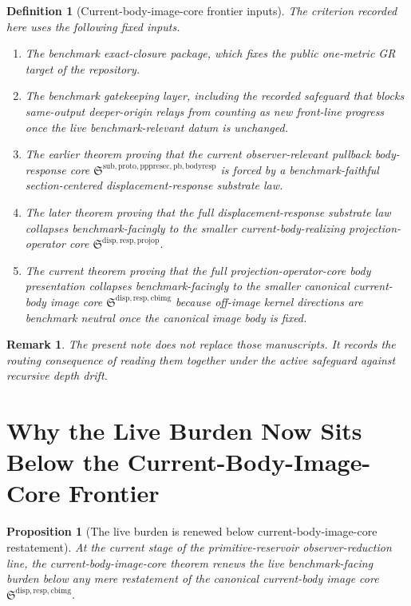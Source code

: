 \documentclass[11pt]{article}
\newcommand{\ProjectionOperatorCore}{\mathfrak S^{\mathrm{disp,resp,projop}}}
\newcommand{\CurrentBodyImageCore}{\mathfrak S^{\mathrm{disp,resp,cbimg}}}
\newcommand{\PullbackBodyResponseCore}{\mathfrak S^{\mathrm{sub,proto,pppresec,pb,bodyresp}}}
\newtheorem{definition}{Definition}
\newtheorem{proposition}{Proposition}
\newtheorem{remark}{Remark}
\begin{document}
\begin{definition}[Current-body-image-core frontier inputs]
The criterion recorded here uses the following fixed inputs.
\begin{enumerate}
    \item The benchmark exact-closure package, which fixes the public one-metric GR target of the repository.
    \item The benchmark gatekeeping layer, including the recorded safeguard that blocks same-output deeper-origin relays from counting as new front-line progress once the live benchmark-relevant datum is unchanged.
    \item The earlier theorem proving that the current observer-relevant pullback body-response core \(\PullbackBodyResponseCore\) is forced by a benchmark-faithful section-centered displacement-response substrate law.
    \item The later theorem proving that the full displacement-response substrate law collapses benchmark-facingly to the smaller current-body-realizing projection-operator core \(\ProjectionOperatorCore\).
    \item The current theorem proving that the full projection-operator-core body presentation collapses benchmark-facingly to the smaller canonical current-body image core \(\CurrentBodyImageCore\) because off-image kernel directions are benchmark neutral once the canonical image body is fixed.
\end{enumerate}
\end{definition}

\begin{remark}
The present note does not replace those manuscripts. It records the routing consequence of reading them together under the active safeguard against recursive depth drift.
\end{remark}

\section{Why the Live Burden Now Sits Below the Current-Body-Image-Core Frontier}

\begin{proposition}[The live burden is renewed below current-body-image-core restatement]
\label{prop:renewed}
At the current stage of the primitive-reservoir observer-reduction line, the current-body-image-core theorem renews the live benchmark-facing burden below any mere restatement of the canonical current-body image core \(\CurrentBodyImageCore\).
\end{proposition}
\end{document}
